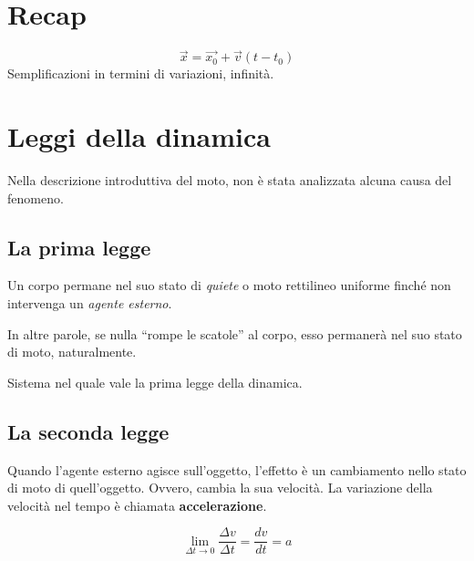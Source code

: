 %

\marginpar{\minitoc}

\section{Recap}
\[ \overrightarrow{x} = \overrightarrow{x_0} + \overrightarrow{v}(t - t_0) \]
Semplificazioni in termini di variazioni, infinità.

\section{Leggi della dinamica}

Nella descrizione introduttiva del moto, non è stata analizzata alcuna causa del
fenomeno.

\subsection{La prima legge}

\vspace{8pt}
\begin{tcolorbox}[colback = red!30, colframe = red!30!black, title = {Prima legge della dinamica (legge di inerzia)}]
    Un corpo permane nel suo stato di \textit{quiete} o moto rettilineo uniforme
    finché non intervenga un \textit{agente esterno}.
\end{tcolorbox}
\vspace{5pt}

In altre parole, se nulla ``rompe le scatole'' al corpo, esso permanerà nel suo
stato di moto, naturalmente.

\vspace{8pt}
\begin{tcolorbox}[colback = yellow!30, colframe = yellow!30!black, title = {Sistema inerziale}]
    Sistema nel quale vale la prima legge della dinamica.
\end{tcolorbox}
\vspace{5pt}

\subsection{La seconda legge}
Quando l'agente esterno agisce sull'oggetto, l'effetto è un cambiamento nello
stato di moto di quell'oggetto. Ovvero, cambia la sua velocità. La variazione
della velocità nel tempo è chiamata \textbf{accelerazione}.

\[ \lim_{\Delta t \to 0} \frac{\Delta v}{\Delta t} = \frac{dv}{dt} = a \]


